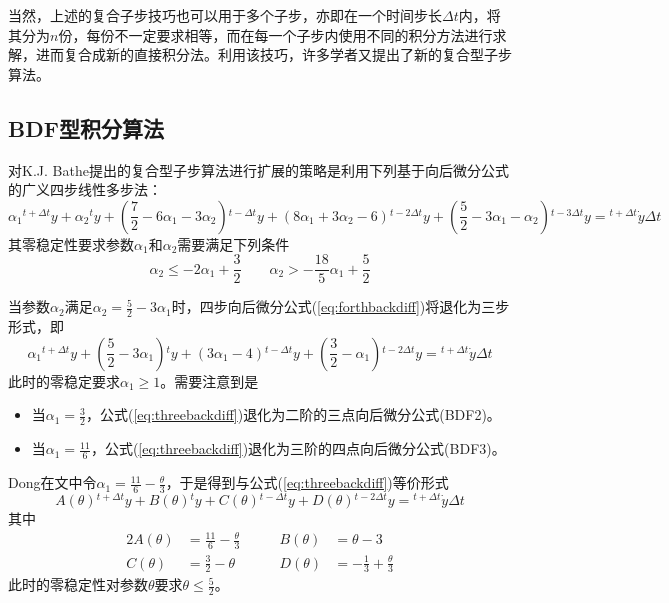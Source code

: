 当然，上述的复合子步技巧也可以用于多个子步，亦即在一个时间步长$\Delta t$内，将其分为$n$份，每份不一定要求相等，而在每一个子步内使用不同的积分方法进行求解，进而复合成新的直接积分法。利用该技巧，许多学者又提出了新的复合型子步算法。
\subsection{BDF型积分算法}
对K.J. Bathe提出的复合型子步算法进行扩展的策略是利用下列基于向后微分公式的广义四步线性多步法\cite{Dong2010}：
\begin{equation}
	\alpha_1{^{t+\Delta t}\!y}+\alpha_2{^{t}\!y}+(\frac{7}{2}-6\alpha_1-3\alpha_2){^{t-\Delta t}\!y}+(8\alpha_1+3\alpha_2-6){^{t-2\Delta t}\!y}+(\frac{5}{2}-3\alpha_1-\alpha_2){^{t-3\Delta t}\!y}={^{t+\Delta t}\!\dot{y}\Delta t}\label{eq:forthbackdiff}
\end{equation}
其零稳定性要求参数$\alpha_1$和$\alpha_2$需要满足下列条件
\begin{equation}
\alpha_2\le-2\alpha_1+\frac{3}{2}\qquad \alpha_2>-\frac{18}{5}\alpha_1+\frac{5}{2}
\end{equation}

当参数$\alpha_2$满足$\alpha_2=\frac{5}{2}-3\alpha_1$时，四步向后微分公式(\ref{eq:forthbackdiff})将退化为三步形式，即
\begin{equation}
	\alpha_1{^{t+\Delta t}\!y}+(\frac{5}{2}-3\alpha_1){^{t}\!y}+(3\alpha_1-4){^{t-\Delta t}\!y}+(\frac{3}{2}-\alpha_1){^{t-2\Delta t}\!y}={^{t+\Delta t}\!\dot{y}\Delta t}\label{eq:threebackdiff}
\end{equation}
此时的零稳定要求$\alpha_1\ge1$。需要注意到是
\begin{itemize}
\item 当$\alpha_1=\frac{3}{2}$，公式(\ref{eq:threebackdiff})退化为二阶的三点向后微分公式(BDF2)。
\item 当$\alpha_1=\frac{11}{6}$，公式(\ref{eq:threebackdiff})退化为三阶的四点向后微分公式(BDF3)。
\end{itemize}

Dong在文中令$\alpha_1=\frac{11}{6}-\frac{\theta}{3}$，于是得到与公式(\ref{eq:threebackdiff})等价形式
\begin{equation}
A(\theta){^{t+\Delta t}\!y}+B(\theta){^{t}\!y}+C(\theta){^{t-\Delta t}\!y}+D(\theta){^{t-2\Delta t}\!y}={^{t+\Delta t}\!\dot{y}}\Delta t\label{eq:Dong12}
\end{equation}
其中
\begin{alignat}{2}
A(\theta)&=\frac{11}{6}-\frac{\theta}{3}&\qquad B(\theta)&=\theta-3\\
C(\theta)&=\frac{3}{2}-\theta&\qquad D(\theta)&=-\frac{1}{3}+\frac{\theta}{3}
\end{alignat}
此时的零稳定性对参数$\theta$要求$\theta\le\frac{5}{2}$。

